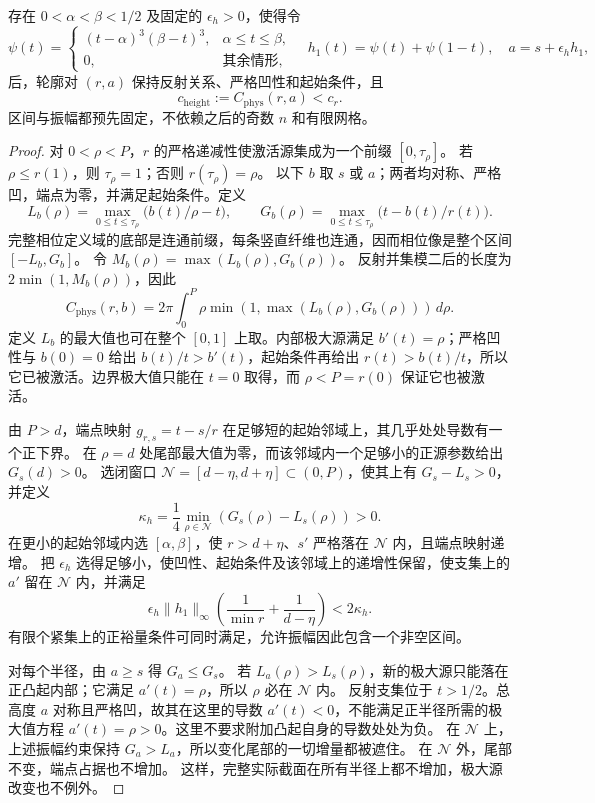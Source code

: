 \begin{proposition}[被端点上边界遮住的高度增量]
\label{prop:upper-height}
存在 $0<\alpha<\beta<1/2$ 及固定的 $\epsilon_h>0$，使得令
\[
 \psi(t)=\begin{cases}(t-\alpha)^3(\beta-t)^3,&\alpha\le t\le\beta,\\0,&\text{其余情形},\end{cases}
 \quad h_1(t)=\psi(t)+\psi(1-t),\quad a=s+\epsilon_h h_1,
\]
后，轮廓对 $(r,a)$ 保持反射关系、严格凹性和起始条件，且
\[
 c_{\mathrm{height}}:=C_{\mathrm{phys}}(r,a)<c_r.
\]
区间与振幅都预先固定，不依赖之后的奇数 $n$ 和有限网格。
\end{proposition}

\begin{proof}
对 $0<\rho<P$，$r$ 的严格递减性使激活源集成为一个前缀 $[0,\tau_\rho]$。
若 $\rho\le r(1)$，则 $\tau_\rho=1$；否则 $r(\tau_\rho)=\rho$。
以下 $b$ 取 $s$ 或 $a$；两者均对称、严格凹，端点为零，并满足起始条件。定义
\[
 L_b(\rho)=\max_{0\le t\le\tau_\rho}\bigl(b(t)/\rho-t\bigr),
 \qquad G_b(\rho)=\max_{0\le t\le\tau_\rho}\bigl(t-b(t)/r(t)\bigr).
\]
完整相位定义域的底部是连通前缀，每条竖直纤维也连通，因而相位像是整个区间 $[-L_b,G_b]$。
令 $M_b(\rho)=\max(L_b(\rho),G_b(\rho))$。
反射并集模二后的长度为 $2\min(1,M_b(\rho))$，因此
\begin{equation}\label{eq:upper-height-cost}
 C_{\mathrm{phys}}(r,b)=2\pi\int_0^P
      \rho\min(1,\max(L_b(\rho),G_b(\rho)))\,d\rho.
\end{equation}
定义 $L_b$ 的最大值也可在整个 $[0,1]$ 上取。内部极大源满足 $b'(t)=\rho$；严格凹性与 $b(0)=0$ 给出 $b(t)/t>b'(t)$，起始条件再给出 $r(t)>b(t)/t$，所以它已被激活。边界极大值只能在 $t=0$ 取得，而 $\rho<P=r(0)$ 保证它也被激活。

由 $P>d$，端点映射 $g_{r,s}=t-s/r$ 在足够短的起始邻域上，其几乎处处导数有一个正下界。
在 $\rho=d$ 处尾部最大值为零，而该邻域内一个足够小的正源参数给出 $G_s(d)>0$。
选闭窗口 $\mathcal N=[d-\eta,d+\eta]\subset(0,P)$，使其上有 $G_s-L_s>0$，并定义
\[
 \kappa_h=\frac14\min_{\rho\in\mathcal N}(G_s(\rho)-L_s(\rho))>0.
\]
在更小的起始邻域内选 $[\alpha,\beta]$，使 $r>d+\eta$、$s'$ 严格落在 $\mathcal N$ 内，且端点映射递增。
把 $\epsilon_h$ 选得足够小，使凹性、起始条件及该邻域上的递增性保留，使支集上的 $a'$ 留在 $\mathcal N$ 内，并满足
\[
 \epsilon_h\|h_1\|_\infty
       \left(\frac1{\min r}+\frac1{d-\eta}\right)<2\kappa_h.
\]
有限个紧集上的正裕量条件可同时满足，允许振幅因此包含一个非空区间。

对每个半径，由 $a\ge s$ 得 $G_a\le G_s$。
若 $L_a(\rho)>L_s(\rho)$，新的极大源只能落在正凸起内部；它满足 $a'(t)=\rho$，所以 $\rho$ 必在 $\mathcal N$ 内。
反射支集位于 $t>1/2$。总高度 $a$ 对称且严格凹，故其在这里的导数 $a'(t)<0$，不能满足正半径所需的极大值方程 $a'(t)=\rho>0$。这里不要求附加凸起自身的导数处处为负。
在 $\mathcal N$ 上，上述振幅约束保持 $G_a>L_a$，所以变化尾部的一切增量都被遮住。
在 $\mathcal N$ 外，尾部不变，端点占据也不增加。
这样，完整实际截面在所有半径上都不增加，极大源改变也不例外。


\end{proof}
